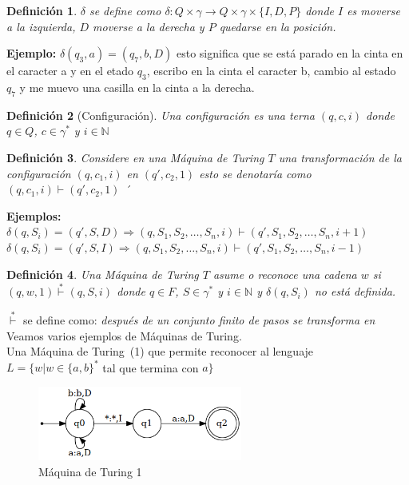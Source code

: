 \documentclass[a4paper,1pt]{report}
\newtheorem*{dfn}{Definición}
\begin{document}
\begin{dfn}
 $\delta$ se define como $\delta: Q\times\gamma \rightarrow Q\times\gamma\times\{I,D,P\}$ donde $I$ es moverse a la izquierda, $D$ moverse a la derecha y $P$ quedarse en la posición.
\end{dfn}

\textbf{Ejemplo:} $\delta(q_3,a)=(q_7,b,D)$ esto significa que se está parado en la cinta en el caracter a y en el etado $q_3$, escribo en la cinta el caracter b, cambio al estado $q_7$ y me muevo una casilla en la cinta a la derecha.

\begin{dfn}[Configuración]
 Una configuración es una terna $(q,c,i)$ donde\\ $q\in Q$, $c\in\gamma^*$ y $i\in\mathbb{N}$
\end{dfn}

\begin{dfn} 
Considere en una Máquina de Turing $T$ una transformación de la configuración $(q,c_1,i)$ en $(q',c_2,1)$ 
esto se denotaría como $(q,c_1,i)\vdash (q',c_2,1)$ ´
\end{dfn}

\textbf{Ejemplos:}
\\
 $\delta(q,S_i)=(q',S,D)\Rightarrow(q,S_1,S_2,\dots,S_n,i)\vdash(q',S_1,S_2,\dots,S_n,i+1)$\\
 $\delta(q,S_i)=(q',S,I)\Rightarrow(q,S_1,S_2,\dots,S_n,i)\vdash(q',S_1,S_2,\dots,S_n,i-1)$
 
 \begin{dfn}
  Una Máquina de Turing $T$ asume o reconoce una cadena $w$ si $(q,w,1)\overset{*}{\vdash}(q,S,i)$ donde
  $q\in F$, $S\in \gamma^*$ y $i \in \mathbb{N}$ y $\delta(q,S_i)$ no está definida.
 \end{dfn}

 $\overset{*}{\vdash}$ se define como: \textit{después de un conjunto finito de pasos se transforma en}\\
 
 Veamos varios ejemplos de Máquinas de Turing.\\
 
 Una Máquina de Turing~(1) que permite reconocer al lenguaje\\ 
 $L=\{w|w\in\{a,b\}^*$ tal que termina con $a\}$

 \begin{figure}[H]
        \centering
        \includegraphics[width=0.6\textwidth]{figures9/tm1.png}
        \caption{Máquina de Turing 1}
\end{figure} 
\end{document}
